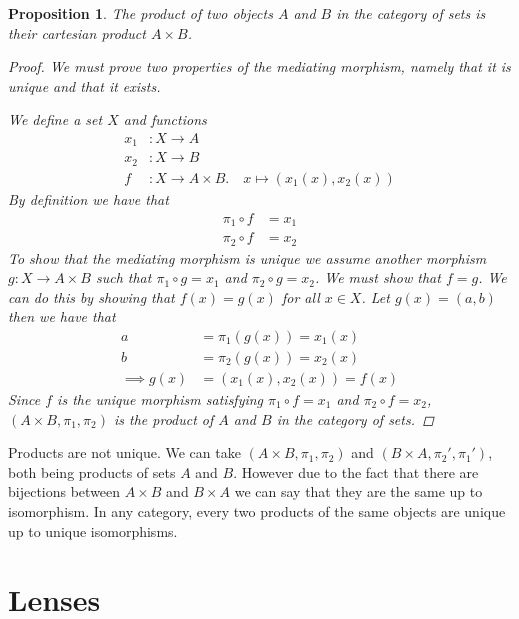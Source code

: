 \documentclass[10pt]{article}
\newtheorem{proposition}{Proposition} %
\begin{document}
\begin{proposition}
  The product of two objects $A$ and $B$ in the category of sets is their cartesian product $A \times B$.
  \begin{proof}
    We must prove two properties of the mediating morphism, namely that it is unique and that it exists.

    We define a set $X$ and functions
    \[
      \begin{aligned}
        x_1 & : X \rightarrow A \\
        x_2 & : X \rightarrow B \\
        f & : X \rightarrow A \times B. \quad x \mapsto (x_1(x), x_2(x))
      \end{aligned}
    \]
    By definition we have that 
    \[
      \begin{aligned}
        \pi_1 \circ f & = x_1 \\
        \pi_2 \circ f & = x_2
      \end{aligned}
    \]
    To show that the mediating morphism is unique we assume another morphism $g : X \rightarrow A \times B$ such that $\pi_1 \circ g = x_1$ and $\pi_2 \circ g = x_2$. We must show that $f = g$. We can do this by showing that $f(x) = g(x)$ for all $x \in X$. Let $g(x) = (a, b)$ then we have that
    \[
      \begin{aligned}
        a & = \pi_1(g(x)) = x_1(x) \\
        b & = \pi_2(g(x)) = x_2(x) \\ 
        \implies g(x) & = (x_1(x), x_2(x)) = f(x)
      \end{aligned}
    \]
    Since $f$ is the unique morphism satisfying $\pi_1 \circ f = x_1$ and $\pi_2 \circ f = x_2$, $(A\times B, \pi_1, \pi_2)$ is the product of $A$ and $B$ in the category of sets.
  \end{proof}
\end{proposition}

\begin{definition}
  Products are not unique. We can take $(A\times B, \pi_1, \pi_2)$ and $(B\times A, \pi_2', \pi_1')$, both being products of sets $A$ and $B$. However due to the fact that there are bijections between $A \times B$ and $B \times A$ we can say that they are the same up to isomorphism. In any category, every two products of the same objects are unique up to unique isomorphisms.
\end{definition}

\section{Lenses}
\end{document}

